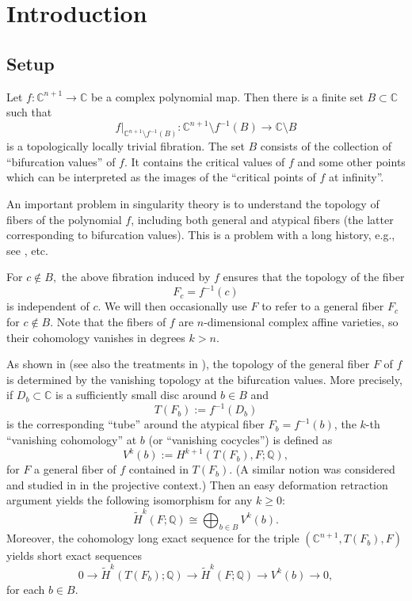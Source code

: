 \documentclass[12pt,leqno,twoside]{amsart}
\theoremstyle{remark}
\theoremstyle{remark}
\theoremstyle{definition}
\theoremstyle{remark}
\theoremstyle{remark}
\theoremstyle{remark}
\numberwithin{equation}{section}  %
\def\be{\begin{equation}}
\def\ee{\end{equation}}
\newcommand{\lra}{\longrightarrow}
\newcommand{\bC}{\mathbb{C}}
\newcommand{\bQ}{\mathbb{Q}}
\begin{document}
\maketitle

\tableofcontents

\section{Introduction}
\subsection{Setup} Let $f\colon \mathbb{C}^{n+1}\rightarrow \mathbb{C}$ be a complex polynomial map. Then there is a finite set $B \subset \mathbb{C}$ such that 
\[f|_{\mathbb{C}^{n+1}\setminus f^{-1}(B)}: \mathbb{C}^{n+1}\setminus f^{-1}(B)\rightarrow \mathbb{C}\setminus B\]
is a topologically locally trivial fibration. The set $B$ consists of the collection of ``bifurcation values'' of $f$. It contains the critical values of $f$ and some other points which can be interpreted as the images of the ``critical points of $f$ at infinity''. 

An important problem in singularity theory is to understand the topology of fibers of the polynomial $f$, including both general and atypical fibers (the latter corresponding to bifurcation values). This is a problem with a long history, e.g., see \cite{Bro, NN, Hamm, Di, Sab, NZ, DS, ST, Pa, ALM, Di0, Bre, T0, T1, T2, Ta}, etc. 

For $c\notin B,$ the above fibration induced by $f$  ensures that the topology of the fiber \[F_c=f^{-1}(c)\] is independent of $c$. We will then occasionally use $F$ to refer to a general fiber $F_c$ for $c\notin B$. Note that the fibers of $f$ are $n$-dimensional complex affine varieties, so their cohomology vanishes in degrees $k>n$. 

As shown in \cite{Bro, NN, ST} (see also the treatments in \cite{Di, T2}), the topology of the general fiber $F$ of $f$ is determined by the vanishing topology at the bifurcation values. More precisely, if $D_b \subset \bC$ is a sufficiently small disc around $b \in B$ and \[T(F_b):=f^{-1}(D_b)\] is the corresponding ``tube'' around the atypical fiber $F_b=f^{-1}(b)$, the $k$-th ``vanishing cohomology'' at $b$ (or ``vanishing cocycles'') is defined as
\[ V^k(b):=H^{k+1}(T(F_b), F;\bQ),\]
for $F$ a general fiber of $f$ contained in $T(F_b)$. (A similar notion was considered and studied in \cite{MPT1} in the projective context.) Then an easy deformation retraction argument yields the following isomorphism for any $k\geq 0$:
\begin{equation}\label{iso-van}
\widetilde{H}^k(F;\bQ)\cong \bigoplus_{b\in B} V^k(b).
\end{equation}
Moreover, the cohomology long exact sequence for the triple $(\bC^{n+1}, T(F_b), F)$ yields short exact sequences
\be\label{ses}
0\lra \widetilde{H}^k(T(F_b);\bQ) \lra \widetilde{H}^k(F;\bQ) \lra V^k(b) \lra 0,
\ee
for each $b \in B$.
\end{document}
